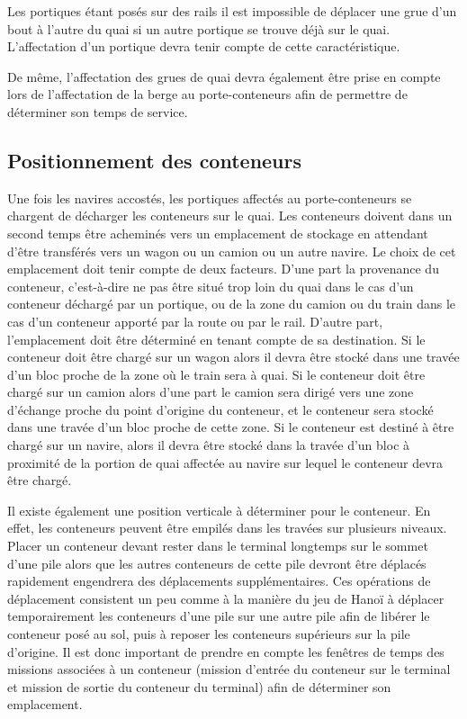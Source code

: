 Les portiques étant posés sur des rails il est impossible de déplacer une grue d'un bout à l'autre du quai si un autre portique se trouve déjà sur le quai. L'affectation d'un portique devra tenir compte de cette caractéristique. 

De même, l'affectation des grues de quai devra également être prise en compte lors de l'affectation de la berge au porte-conteneurs afin de permettre de déterminer son temps de service. 


\subsection{Positionnement des conteneurs}	%

Une fois les navires accostés, les portiques affectés au porte-conteneurs se chargent de décharger les conteneurs sur le quai. 
Les conteneurs doivent dans un second temps être acheminés vers un emplacement de stockage en attendant d'être transférés vers un wagon ou un camion ou un autre navire. 
Le choix de cet emplacement doit tenir compte de deux facteurs. D'une part la provenance du conteneur, c'est-à-dire ne pas être situé trop loin du quai dans le cas d'un conteneur déchargé par un portique, ou de la zone du camion ou du train dans le cas d'un conteneur apporté par la route ou par le rail. D'autre part, l'emplacement doit être déterminé en tenant compte de sa destination. Si le conteneur doit être chargé sur un wagon alors il devra être stocké dans une travée d'un bloc proche de la zone où le train sera à quai. Si le conteneur doit être chargé sur un camion alors d'une part le camion sera dirigé vers une zone d'échange proche du point d'origine du conteneur, et le conteneur sera stocké dans une travée d'un bloc proche de cette zone. Si le conteneur est destiné à être chargé sur un navire, alors il devra être stocké dans la travée d'un bloc à proximité de la portion de quai affectée au navire sur lequel le conteneur devra être chargé.

Il existe également une position verticale à déterminer pour le conteneur. En effet, les conteneurs peuvent être empilés dans les travées sur plusieurs niveaux. Placer un conteneur devant rester dans le terminal longtemps sur le sommet d'une pile alors que les autres conteneurs de cette pile devront être déplacés rapidement engendrera des déplacements supplémentaires. Ces opérations de déplacement consistent un peu comme à la manière du jeu de Hanoï à déplacer temporairement les conteneurs d'une pile sur une autre pile afin de libérer le conteneur posé au sol, puis à reposer les conteneurs supérieurs sur la pile d'origine.
Il est donc important de prendre en compte les fenêtres de temps des missions associées à un conteneur (mission d'entrée du conteneur sur le terminal et mission de sortie du conteneur du terminal) afin de déterminer son emplacement.

